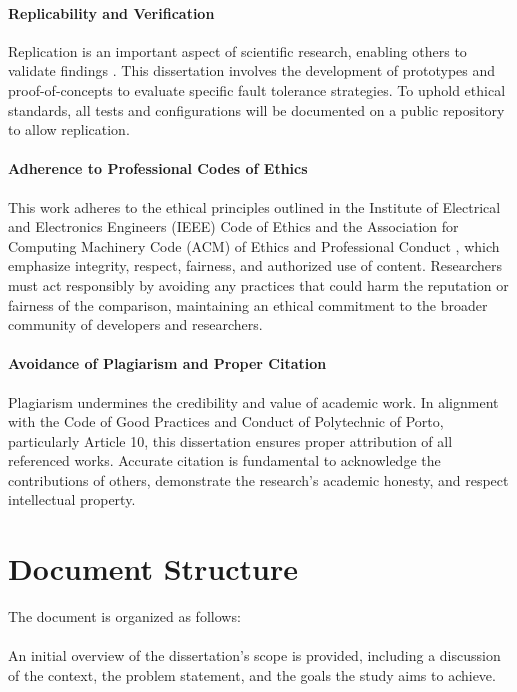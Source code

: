\paragraph{Replicability and Verification} Replication is an important aspect of scientific research, enabling others to validate findings \cite{nspe-ethics}. This dissertation involves the development of prototypes and proof-of-concepts to evaluate specific fault tolerance strategies. To uphold ethical standards, all tests and configurations will be documented on a public repository to allow replication.

\paragraph{Adherence to Professional Codes of Ethics} This work adheres to the ethical principles outlined in the Institute of Electrical and Electronics Engineers (IEEE) Code of Ethics \cite{ieee-ethics} and the Association for Computing Machinery Code (ACM) of Ethics and Professional Conduct \cite{acm-ethics}, which emphasize integrity, respect, fairness, and authorized use of content. Researchers must act responsibly by avoiding any practices that could harm the reputation or fairness of the comparison, maintaining an ethical commitment to the broader community of developers and researchers.

\paragraph{Avoidance of Plagiarism and Proper Citation} Plagiarism undermines the credibility and value of academic work. In alignment with the Code of Good Practices and Conduct of Polytechnic of Porto, particularly Article 10, this dissertation ensures proper attribution of all referenced works. Accurate citation is fundamental to acknowledge the contributions of others, demonstrate the research’s academic honesty, and respect intellectual property.

\section{Document Structure}

The document is organized as follows:

\paragraph{} An initial overview of the dissertation's scope is provided, including a discussion of the context, the problem statement, and the goals the study aims to achieve.

